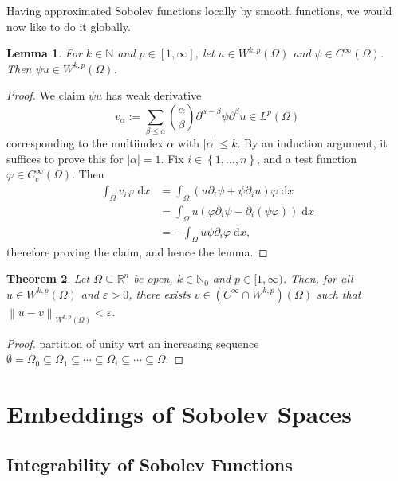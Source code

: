 \documentclass{book}
\newcommand{\bbN}{\mathbb{N}}
\newcommand{\bbR}{\mathbb{R}}
\renewcommand{\d}{\mathrm{d}}
\renewcommand{\epsilon}{\varepsilon}
\renewcommand{\phi}{\varphi}
\newcommand{\abs}[1]{\left\lvert {#1} \right\rvert}
\newcommand{\norm}[1]{\left\lVert {#1} \right\rVert}
\newcommand{\set}[1]{\left\{ {#1} \right\}}
\newtheorem{theorem}{Theorem}[chapter]
\newtheorem{lemma}[theorem]{Lemma}
\theoremstyle{definition}
\numberwithin{equation}{chapter}
\begin{document}
Having approximated Sobolev functions locally by smooth functions, we would now like to do it globally.
\begin{lemma}
    For $k \in \bbN$ and $p \in [1,\infty]$, let $u \in W^{k,p}(\Omega)$ and $\psi \in C^\infty(\Omega)$. Then $\psi u \in W^{k,p}(\Omega)$.
\end{lemma}
\begin{proof}
    We claim $\psi u$ has weak derivative
    \begin{equation}
        v_\alpha := \sum_{\beta \leq \alpha} {\alpha \choose \beta} \partial^{\alpha - \beta} \psi \partial^{\beta} u \in L^p(\Omega)
    \end{equation}
    corresponding to the multiindex $\alpha$ with $\abs{\alpha} \leq k$. By an induction argument, it suffices to prove this for $\abs{\alpha} = 1$. Fix $i \in \set{1,\dots,n}$, and a test function $\phi \in C_c^\infty(\Omega)$. Then 
    \begin{equation} \begin{aligned}
        \int_\Omega v_i \phi \; \d{x}
        &= \int_\Omega ( u \partial_i \psi + \psi \partial_i u ) \phi \; \d{x} \\
        &= \int_\Omega u (\phi \partial_i \psi - \partial_i(\psi \phi)) \; \d{x} \\
        &= - \int_\Omega u \psi \partial_i \phi \; \d{x},
    \end{aligned} \end{equation}
    therefore proving the claim, and hence the lemma.
\end{proof}
\begin{theorem}
    Let $\Omega \subseteq \bbR^n$ be open, $k \in \bbN_0$ and $p \in [1,\infty)$. Then, for all $u \in W^{k,p}(\Omega)$ and $\epsilon > 0$, there exists $v \in (C^\infty \cap W^{k,p})(\Omega)$ such that $\norm{u - v}_{W^{k,p}(\Omega)} < \epsilon$.
\end{theorem}
\begin{proof}
    partition of unity wrt an increasing sequence $\emptyset = \Omega_0 \subseteq \Omega_1 \subseteq \cdots \subseteq \Omega_i \subseteq \cdots \subseteq \Omega$.
\end{proof}



\chapter{Embeddings of Sobolev Spaces}

\section{Integrability of Sobolev Functions}
\end{document}
